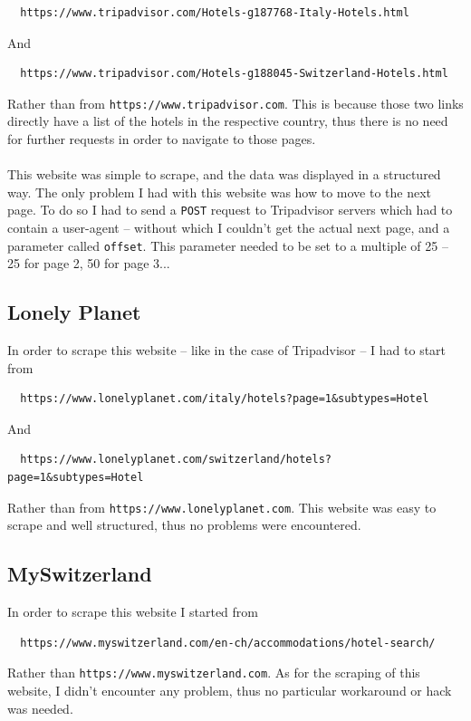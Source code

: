 \documentclass[unicode,11pt,a4paper,oneside,numbers=endperiod,openany]{scrartcl}
\begin{document}
\begin{verbatim}
  https://www.tripadvisor.com/Hotels-g187768-Italy-Hotels.html
\end{verbatim}
And

\begin{verbatim}
  https://www.tripadvisor.com/Hotels-g188045-Switzerland-Hotels.html
\end{verbatim}
Rather than from \verb|https://www.tripadvisor.com|. This is because those two links directly have a list of the hotels in the respective country, thus there is no need for further requests in order to navigate to those pages. \\ \\
This website was simple to scrape, and the data was displayed in a structured way. The only problem I had with this website was how to move to the next page. To do so I had to send a \verb|POST| request to Tripadvisor servers which had to contain a user-agent -- without which I couldn't get the actual next page, and a parameter called \verb|offset|. This parameter needed to be set to a multiple of 25 -- 25 for page 2, 50 for page 3...

\subsection{Lonely Planet}
In order to scrape this website -- like in the case of Tripadvisor -- I had to start from

\begin{verbatim}
  https://www.lonelyplanet.com/italy/hotels?page=1&subtypes=Hotel
\end{verbatim}
And

\begin{verbatim}
  https://www.lonelyplanet.com/switzerland/hotels?page=1&subtypes=Hotel
\end{verbatim}
Rather than  from \verb|https://www.lonelyplanet.com|. This website was easy to scrape and well structured, thus no problems were encountered.

\subsection{MySwitzerland}
In order to scrape this website I started from

\begin{verbatim}
  https://www.myswitzerland.com/en-ch/accommodations/hotel-search/
\end{verbatim}
Rather than \verb|https://www.myswitzerland.com|. As for the scraping of this website, I didn't encounter any problem, thus no particular workaround or hack was needed.
\end{document}
